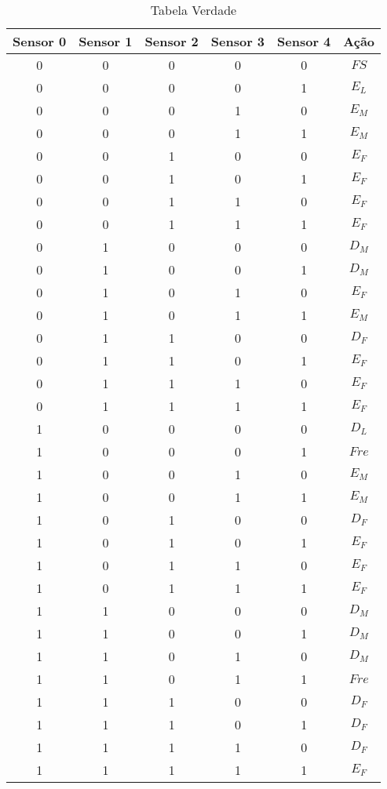 
\begin{table}[H]
\centering
\caption{Tabela Verdade}
\label{IA}
\begin{tabular}{|ccccc|c|}
\hline
 \textbf{Sensor 0} & \textbf{Sensor 1} & \textbf{Sensor 2} & 
 \textbf{Sensor 3} & \textbf{Sensor 4} & \textbf{Ação} \\ 
\hline
 0 & 0 & 0 & 0 & 0 & $FS$ \\ \hline
 0 & 0 & 0 & 0 & 1 & $E_L$ \\ \hline
 0 & 0 & 0 & 1 & 0 & $E_M$ \\ \hline
 0 & 0 & 0 & 1 & 1 & $E_M$ \\ \hline
 0 & 0 & 1 & 0 & 0 & $E_F$ \\ \hline
 0 & 0 & 1 & 0 & 1 & $E_F$ \\ \hline
 0 & 0 & 1 & 1 & 0 & $E_F$ \\ \hline
 0 & 0 & 1 & 1 & 1 & $E_F$ \\ \hline
 0 & 1 & 0 & 0 & 0 & $D_M$ \\ \hline
 0 & 1 & 0 & 0 & 1 & $D_M$ \\ \hline
 0 & 1 & 0 & 1 & 0 & $E_F$ \\ \hline
 0 & 1 & 0 & 1 & 1 & $E_M$ \\ \hline
 0 & 1 & 1 & 0 & 0 & $D_F$ \\ \hline
 0 & 1 & 1 & 0 & 1 & $E_F$ \\ \hline
 0 & 1 & 1 & 1 & 0 & $E_F$ \\ \hline
 0 & 1 & 1 & 1 & 1 & $E_F$ \\ \hline
 1 & 0 & 0 & 0 & 0 & $D_L$ \\ \hline
 1 & 0 & 0 & 0 & 1 & $Fre$ \\ \hline
 1 & 0 & 0 & 1 & 0 & $E_M$ \\ \hline
 1 & 0 & 0 & 1 & 1 & $E_M$ \\ \hline
 1 & 0 & 1 & 0 & 0 & $D_F$ \\ \hline
 1 & 0 & 1 & 0 & 1 & $E_F$ \\ \hline
 1 & 0 & 1 & 1 & 0 & $E_F$ \\ \hline
 1 & 0 & 1 & 1 & 1 & $E_F$ \\ \hline
 1 & 1 & 0 & 0 & 0 & $D_M$ \\ \hline
 1 & 1 & 0 & 0 & 1 & $D_M$ \\ \hline
 1 & 1 & 0 & 1 & 0 & $D_M$ \\ \hline
 1 & 1 & 0 & 1 & 1 & $Fre$ \\ \hline
 1 & 1 & 1 & 0 & 0 & $D_F$ \\ \hline
 1 & 1 & 1 & 0 & 1 & $D_F$ \\ \hline
 1 & 1 & 1 & 1 & 0 & $D_F$ \\ \hline
 1 & 1 & 1 & 1 & 1 & $E_F$ \\ \hline
\end{tabular} 
\end{table}

